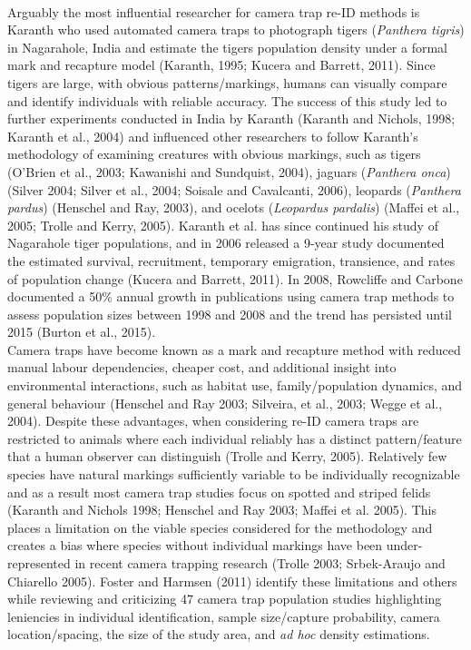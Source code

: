 \documentclass[11pt]{article}
\begin{document}
\newline
\\
Arguably the most influential researcher for camera trap re-ID methods is Karanth who used automated camera traps to photograph tigers (\textit{Panthera tigris}) in Nagarahole, India and estimate the tigers population density under a formal mark and recapture model (Karanth, 1995; Kucera and Barrett, 2011). Since tigers are large, with obvious patterns/markings, humans can visually compare and identify individuals with reliable accuracy. The success of this study led to further experiments conducted in India by Karanth (Karanth and Nichols, 1998; Karanth et al., 2004) and influenced other researchers to follow Karanth's methodology of examining creatures with obvious markings, such as tigers (O'Brien et al., 2003; Kawanishi and Sundquist, 2004), jaguars (\textit{Panthera onca}) (Silver 2004; Silver et al., 2004; Soisale and Cavalcanti, 2006), leopards (\textit{Panthera pardus}) (Henschel and Ray, 2003), and ocelots (\textit{Leopardus pardalis}) (Maffei et al., 2005; Trolle and Kerry, 2005). Karanth et al. has since continued his study of Nagarahole tiger populations, and in 2006 released a 9-year study documented the estimated survival, recruitment, temporary emigration, transience, and rates of population change (Kucera and Barrett, 2011). In 2008, Rowcliffe and Carbone documented a 50\% annual growth in publications using camera trap methods to assess population sizes between 1998 and 2008 and the trend has persisted until 2015 (Burton et al., 2015). 
\newline
\\
Camera traps have become known as a mark and recapture method with reduced manual labour dependencies, cheaper cost, and additional insight into environmental interactions, such as habitat use, family/population dynamics, and general behaviour (Henschel and Ray 2003; Silveira, et al., 2003; Wegge et al., 2004). Despite these advantages, when considering re-ID camera traps are restricted to animals where each individual reliably has a distinct pattern/feature that a human observer can distinguish (Trolle and Kerry, 2005). Relatively few species have natural markings sufficiently variable to be individually recognizable and as a result most camera trap studies focus on spotted and striped felids (Karanth and Nichols 1998; Henschel and Ray 2003; Maffei et al. 2005). This places a limitation on the viable species considered for the methodology and creates a bias where species without individual markings have been under-represented in recent camera trapping research (Trolle 2003; Srbek-Araujo and Chiarello 2005). Foster and Harmsen (2011) identify these limitations and others while reviewing and criticizing 47 camera trap population studies highlighting leniencies in individual identification, sample size/capture probability, camera location/spacing, the size of the study area, and \textit{ad hoc} density estimations. 
\end{document}
